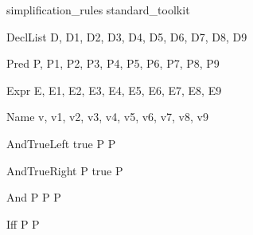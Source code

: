 \begin{zsection}
  \SECTION simplification\_rules \parents standard\_toolkit
\end{zsection}

\begin{zedjoker}{DeclList} D, D1, D2, D3, D4, D5, D6, D7, D8, D9 \end{zedjoker}
\begin{zedjoker}{Pred} P, P1, P2, P3, P4, P5, P6, P7, P8, P9 \end{zedjoker}
\begin{zedjoker}{Expr} E, E1, E2, E3, E4, E5, E6, E7, E8, E9 \end{zedjoker}
\begin{zedjoker}{Name} v, v1, v2, v3, v4, v5, v6, v7, v8, v9 \end{zedjoker}


\begin{zedrule}{AndTrueLeft}
  true \land P \iff P
\end{zedrule}

\begin{zedrule}{AndTrueRight}
  P \land true \iff P
\end{zedrule}

\begin{zedrule}{And}
  P \land P \iff P
\end{zedrule}

\begin{zedrule}{Iff}
  P \iff P
\end{zedrule}
